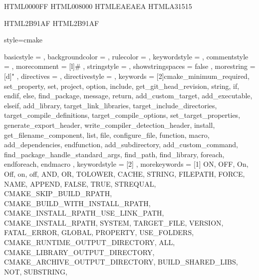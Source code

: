 

\usepackage{accsupp}

\definecolor{msvc_keyword}   {HTML}{0000FF} 
\definecolor{msvc_comment}   {HTML}{008000} 
\definecolor{msvc_frame}     {HTML}{EAEAEA}
\definecolor{msvc_string}    {HTML}{A31515}

\definecolor{msvc_operators} {HTML}{2B91AF}
\definecolor{msvc_stl}       {HTML}{2B91AF}

\makeatletter
\def\lst@outputspace{{\ifx\lst@bkgcolor\empty\color{white}\else\lst@bkgcolor\fi\lst@visiblespace}}
\makeatother

{
	style=cmake
}

{
    basicstyle       = 
    \ttfamily
    \lst@ifdisplaystyle\scriptsize\fi %
,   backgroundcolor  = \color{msvc_background}
,   rulecolor        = \color{msvc_frame}
,   keywordstyle     = \lst@ifdisplaystyle\color{msvc_keyword}\fi
,   commentstyle     = \lst@ifdisplaystyle\color{msvc_comment}\fi
,   morecomment      = [l]{\#}
,   stringstyle      = \lst@ifdisplaystyle\color{msvc_string}\fi
,   showstringspaces = false
,   morestring       = [d]{"}
,	directives       = {}
,	directivestyle   = \lst@ifdisplaystyle\color{msvc_directives}\fi
,	keywords         = [2]{cmake_minimum_required, set_property, set, project, option, include, get_git_head_revision,
						string, if, endif, else, find_package, message, return, add_custom_target, add_executable, elseif,
						add_library, target_link_libraries, target_include_directories, target_compile_definitions,
						target_compile_options, set_target_properties, generate_export_header, write_compiler_detection_header,
						install, get_filename_component, list, file, configure_file, function, macro, add_dependencies, endfunction,
						add_subdirectory, add_custom_command, find_package_handle_standard_args, find_path, find_library,
						foreach, endforeach, endmacro }
,	keywordstyle     = [2]\lst@ifdisplaystyle\color{msvc_stl}\fi
,   morekeywords     = [1]{ ON, OFF, On, Off, on, off, AND, OR, TOLOWER, CACHE, STRING, FILEPATH, FORCE, NAME, APPEND,
						FALSE, TRUE, STREQUAL, CMAKE_SKIP_BUILD_RPATH, CMAKE_BUILD_WITH_INSTALL_RPATH,
						CMAKE_INSTALL_RPATH_USE_LINK_PATH, CMAKE_INSTALL_RPATH, SYSTEM, TARGET_FILE,
						VERSION, FATAL_ERROR, GLOBAL, PROPERTY, USE_FOLDERS, CMAKE_RUNTIME_OUTPUT_DIRECTORY, ALL,
						CMAKE_LIBRARY_OUTPUT_DIRECTORY, CMAKE_ARCHIVE_OUTPUT_DIRECTORY, BUILD_SHARED_LIBS, NOT, SUBSTRING,
}}
